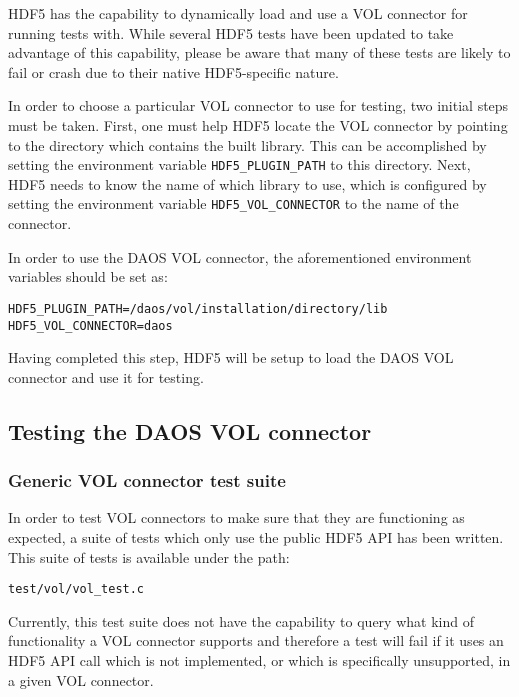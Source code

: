 \documentclass[12pt]{THG_Guide}
\begin{document}
HDF5 has the capability to dynamically load and use a VOL connector for running tests with. While several HDF5 tests have been updated to take advantage of this capability, please be aware that many of these tests are likely to fail or crash due to their native HDF5-specific nature.

In order to choose a particular VOL connector to use for testing, two initial steps must be taken. First, one must help HDF5 locate the VOL connector by pointing to the directory which contains the built library. This can be accomplished by setting the environment variable \texttt{HDF5\_PLUGIN\_PATH} to this directory. Next, HDF5 needs to know the name of which library to use, which is configured by setting the environment variable \texttt{HDF5\_VOL\_CONNECTOR} to the name of the connector.

In order to use the DAOS VOL connector, the aforementioned environment variables should be set as:

\begin{verbatim}
HDF5_PLUGIN_PATH=/daos/vol/installation/directory/lib
HDF5_VOL_CONNECTOR=daos
\end{verbatim}

Having completed this step, HDF5 will be setup to load the DAOS VOL connector and use it for testing.

\newpage

\subsection{Testing the DAOS VOL connector}

\subsubsection{Generic VOL connector test suite}

In order to test VOL connectors to make sure that they are functioning as expected, a suite of tests which only use the public HDF5 API has been written. This suite of tests is available under the path:

\begin{verbatim}
test/vol/vol_test.c
\end{verbatim}

Currently, this test suite does not have the capability to query what kind of functionality a VOL connector supports and therefore a test will fail if it uses an HDF5 API call which is not implemented, or which is specifically unsupported, in a given VOL connector.
\end{document}

